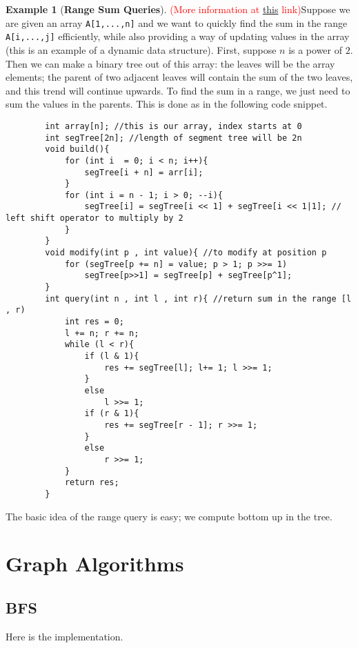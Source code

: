 \documentclass[12pt,a4paper]{amsart}
\numberwithin{equation}{section}
\theoremstyle{definition}
\newtheorem{Ex}{Example}[section]
\begin{document}
\begin{Ex}[\textbf{Range Sum Queries}]
    \textcolor{red}{(More information at \href{https://codeforces.com/blog/entry/18051}{this} link)}Suppose we are given an array \verb|A[1,...,n]| and we want to quickly find the sum in the range \verb|A[i,...,j]| efficiently, while also providing a way of updating values in the array (this is an example of a dynamic data structure). First, suppose $n$ is a power of $2$. Then we can make a binary tree out of this array: the leaves will be the array elements; the parent of two adjacent leaves will contain the sum of the two leaves, and this trend will continue upwards. To find the sum in a range, we just need to sum the values in the parents. This is done as in the following code snippet.
    \begin{lstlisting}
        int array[n]; //this is our array, index starts at 0
        int segTree[2n]; //length of segment tree will be 2n
        void build(){
            for (int i  = 0; i < n; i++){
                segTree[i + n] = arr[i];
            }
            for (int i = n - 1; i > 0; --i){
                segTree[i] = segTree[i << 1] + segTree[i << 1|1]; // left shift operator to multiply by 2
            }
        }
        void modify(int p , int value){ //to modify at position p
            for (segTree[p += n] = value; p > 1; p >>= 1) 
                segTree[p>>1] = segTree[p] + segTree[p^1];
        }
        int query(int n , int l , int r){ //return sum in the range [l , r)
            int res = 0;
            l += n; r += n;
            while (l < r){
                if (l & 1){
                    res += segTree[l]; l+= 1; l >>= 1;
                }
                else
                    l >>= 1;
                if (r & 1){
                    res += segTree[r - 1]; r >>= 1;
                }
                else
                    r >>= 1;
            }
            return res;
        }
    \end{lstlisting}
    The basic idea of the range query is easy; we compute bottom up in the tree.
\end{Ex}

\section{Graph Algorithms}

\subsection{BFS} Here is the implementation. 
\end{document}
